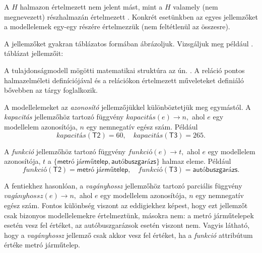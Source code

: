 \begin{megjegyzes}
	A $H$ halmazon értelmezett  nem jelent mást, mint a $H$ valamely (nem megnevezett) részhalmazán értelmezett . Konkrét esetünkben az egyes jellemzőket a modellelemek egy-egy részére értelmezzük (nem feltétlenül az összesre).
\end{megjegyzes}

A jellemzőket gyakran táblázatos formában ábrázoljuk. Vizsgáljuk meg például . táblázat jellemzőit:

\begin{table}[H]
	\centering
	
\end{table}


\begin{megjegyzes}
	A tulajdonságmodell mögötti matematikai struktúra az ún. . A reláció pontos halmazelméleti definíciójával és a relációkon értelmezett műveleteket definiáló  bővebben az \adatb tárgy foglalkozik.
\end{megjegyzes}

A modellelemeket az \textit{azonosító} jellemzőjükkel különböztetjük meg egymástól. %
A \textit{kapacitás} jellemzőhöz tartozó függvény
$\mathit{kapacitás}(e) \rightarrow n,$
ahol $e$ egy modellelem azonosítója, $n$ egy nemnegatív egész szám. 
Például
$$\mathit{kapacitás}(\mathsf{T2}) = 60, \quad \mathit{kapacitás}(\mathsf{T3}) = 265.$$

A \textit{funkció} jellemzőhöz tartozó függvény
$\mathit{funkció}(e) \rightarrow t,$
ahol $e$ egy modellelem azonosítója, $t$ a $\{\textsf{metró járműtelep}, \textsf{autóbuszgarázs}\}$ halmaz eleme.
Például
$$\mathit{funkció}(\mathsf{T2}) = \textsf{metró járműtelep}, \quad \mathit{funkció}(\mathsf{T3}) = \textsf{autóbuszgarázs}.$$

A fentiekhez hasonlóan, a \textit{vagányhossz} jellemzőhöz tartozó parciális függvény 
$\mathit{vagányhossz}(e) \rightarrow n,$
ahol $e$ egy modellelem azonosítója, $n$ egy nemnegatív egész szám. Fontos különbség viszont az eddigiekhez képest, hogy ezt jellemzőt csak bizonyos modellelemekre értelmeztünk, másokra nem: a metró járműtelepek esetén vesz fel értéket, az autóbuszgarázsok esetén viszont nem. Vagyis látható, hogy a \textit{vagányhossz} jellemző csak akkor vesz fel értéket, ha a \textit{funkció} attribútum értéke \textsf{metró járműtelep}.

